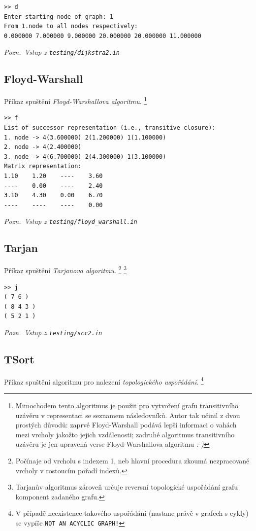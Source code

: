 \documentclass[11pt,a4paper]{article}
\begin{document}
\begin{verbatim}
>> d
Enter starting node of graph: 1
From 1.node to all nodes respectively:
0.000000 7.000000 9.000000 20.000000 20.000000 11.000000 
\end{verbatim}

{\noindent \sl Pozn.~Vstup z \tt testing/dijkstra2.in}

\subsection{Floyd-Warshall}
Příkaz spuštění {\sl Floyd-Warshallova algoritmu\/}.%
\footnote{Mimochodem tento algoritmus je použit pro vytvoření grafu
transitivního uzávěru v representaci se seznamem následovníků.
Autor tak učinil z dvou prostých důvodů: zaprvé Floyd-Warshall podává lepší
informaci o vahách mezi vrcholy jakožto jejich vzdálenosti; zadruhé algoritmus
transitivního uzávěru je jen upravená verse Floyd-Warshallova algoritmu \sl :-)}


\begin{verbatim}
>> f
List of successor representation (i.e., transitive closure):
1. node -> 4(3.600000) 2(1.200000) 1(1.100000)
2. node -> 4(2.400000)
3. node -> 4(6.700000) 2(4.300000) 1(3.100000)
Matrix representation:
1.10    1.20    ----    3.60
----    0.00    ----    2.40
3.10    4.30    0.00    6.70
----    ----    ----    0.00
\end{verbatim}

{\noindent \sl Pozn.~Vstup z \tt testing/floyd\_warshall.in}

\subsection{Tarjan}
Příkaz spuštění {\sl Tarjanova algoritmu\/}.%
\footnote{Počínaje od vrcholu s indexem 1, neb hlavní procedura zkoumá
  nezpracované vrcholy v rostoucím pořadí indexů.}%
\footnote{Tarjanův algoritmus zároveň určuje reversní topologické uspořádání
  grafu komponent zadaného grafu.}

\begin{verbatim}
>> j
( 7 6 )
( 8 4 3 )
( 5 2 1 )
\end{verbatim}

{\noindent \sl Pozn.~Vstup z \tt testing/scc2.in}

\subsection{TSort}
Příkaz spuštění algoritmu pro nalezení {\sl topologického uspořádání\/}.%
\footnote{V případě neexistence takového uspořádání (nastane právě v grafech s
  cykly) se vypíše \tt NOT AN ACYCLIC GRAPH!}
\end{document}
